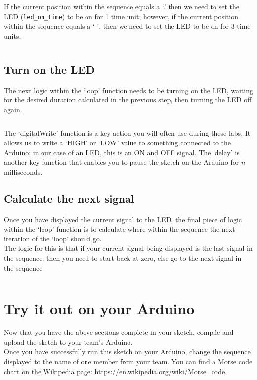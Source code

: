 \documentclass[11pt,a4paper]{article}
\begin{document}
\noindent
If the current position within the sequence equals a `.' then we need to set the LED (\verb|led_on_time|) to be on for 1 time unit; however, if the current position within the sequence equals a `-', then we need to set the LED to be on for 3 time units.

\inputminted{arduino}{./src/3-calculate-duration.txt}

\subsection{Turn on the LED}
\label{sec:led}
The next logic within the `loop' function needs to be turning on the LED, waiting for the desired duration calculated in the previous step, then turning the LED off again.

\inputminted{arduino}{./src/4-flash-led.txt}

\noindent
The `digitalWrite' function is a key action you will often use during these labs. It allows us to write a `HIGH' or `LOW' value to something connected to the Arduino; in our case of an LED, this is an ON and OFF signal. The `delay' is another key function that enables you to pause the sketch on the Arduino for $n$ milliseconds. 

\subsection{Calculate the next signal}
\label{sec:next}
Once you have displayed the current signal to the LED, the final piece of logic within the `loop' function is to calculate where within the sequence the next iteration of the `loop' should go.\\

\noindent
The logic for this is that if your current signal being displayed is the last signal in the sequence, then you need to start back at zero, else go to the next signal in the sequence.

\inputminted{arduino}{./src/5-next-sequence.txt}

\section{Try it out on your Arduino}
Now that you have the above sections complete in your sketch, compile and upload the sketch to your team's Arduino.\\ 

\noindent
Once you have successfully run this sketch on your Arduino, change the sequence displayed to the name of one member from your team. You can find a Morse code chart on the Wikipedia page: \url{https://en.wikipedia.org/wiki/Morse_code}.\\
\end{document}
